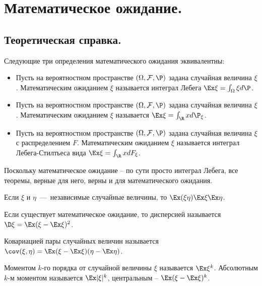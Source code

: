 \section{Математическое ожидание.}
\subsection{Теоретическая справка.}
\begin{theoremdefinition}
    Следующие три определения математического ожидания эквивалентны:
    \begin{itemize}
        \item Пусть на вероятностном пространстве $(\Omega, \mathcal{F}, \P)$ задана случайная величина $\xi$. Математическим ожиданием $\xi$ называется интеграл Лебега $\Ex \xi = \int_\Omega \xi d\P$.
        \item Пусть на вероятностном пространстве $(\Omega, \mathcal{F}, \P)$ задана случайная величина $\xi$. Математическим ожиданием $\xi$ называется $\Ex \xi = \int_\R xd\P_\xi$.
        \item Пусть на вероятностном пространстве $(\Omega, \mathcal{F}, \P)$ задана случайная величина $\xi$ с распределением $F$. Математическим ожиданием $\xi$ называется интеграл Лебега-Стилтьеса вида $\Ex \xi = \int_\R xdF_{\xi}$.
    \end{itemize}
\end{theoremdefinition}
\begin{note}
    Поскольку математическое ожидание -- по сути просто интеграл Лебега, все теоремы, верные для него, верны и для математического ожидания.
\end{note}
\begin{proposition}
    Если $\xi$ и $\eta$~---~независимые случайные величины, то $\Ex(\xi \eta) \Ex \xi \Ex \eta$.
\end{proposition}
\begin{definition}
    Если существует математическое ожидание, то дисперсией называется $\D \xi = \Ex (\xi - \Ex \xi)^2$.
\end{definition}
\begin{definition}
    Ковариацией пары случайных величин называется $\cov(\xi, \eta) = \Ex(\xi - \Ex \xi)(\eta - \Ex \eta)$.
\end{definition}
\begin{definition}
    Моментом $k$-го порядка от случайной величины $\xi$ называется $\Ex \xi^k$.
    Абсолютным $k$-м моментом называется $\Ex |\xi|^k$, центральным -- $\Ex(\xi - \Ex \xi)^k$.
\end{definition}